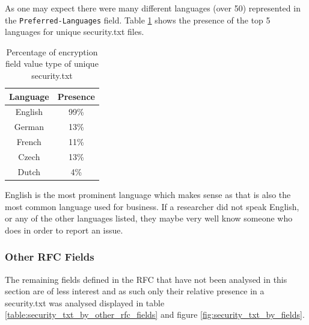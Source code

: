 \documentclass{mscreport}
\begin{document}
As one may expect there were many different languages (over 50) represented in the \texttt{Preferred-Languages} field. Table \ref{table:security_txt_preferred_languages} shows the presence of the top 5 languages for unique security.txt files.

\begin{table}[H]
  \begin{center}
    \begin{tabular}{|c|c|}  %
      \hline
      \textbf{Language} & \textbf{Presence}\\
      \hline
      English & 99\%\\
      \hline
      German & 13\%\\
      \hline
      French & 11\%\\
      \hline
      Czech  & 13\%\\
      \hline
      Dutch & 4\%\\
      \hline
    \end{tabular}
    \caption{Percentage of encryption field value type of unique security.txt}
    \label{table:security_txt_preferred_languages} %
  \end{center}
\end{table}

\noindent
English is the most prominent language which makes sense as that is also the most common language used for business. If a researcher did not speak English, or any of the other languages listed,  they maybe very well know someone who does in order to report an issue.

\subsubsection{Other RFC Fields}

The remaining fields defined in the RFC that have not been analysed in this section are of less interest and as such only their relative presence in a security.txt was analysed displayed in table \ref{table:security_txt_by_other_rfc_fields} and figure \ref{fig:security_txt_by_fields}.
\end{document}
